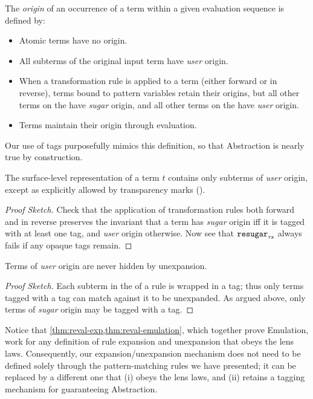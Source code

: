 \begin{definition}
\label{def:reval-origin}
The \emph{origin} of an occurrence of a term within a given evaluation
sequence is defined by:
\begin{itemize}
\item Atomic terms have no origin.
\item All subterms of the original input term have \emph{user} origin.
\item When a transformation rule is applied to a term (either forward or
  in reverse), terms bound to pattern variables retain their origins, but
  all other terms on the  have \emph{sugar} origin, and
  all other terms on the  have \emph{user} origin.
\item Terms maintain their origin through evaluation.
\end{itemize}
\end{definition}

Our use of {\MacBodyf} tags purposefully mimics this definition, so that
Abstraction is nearly true by construction.

\begin{theorem}[Abstraction 1]
\label{thm:reval-abstraction}
The surface-level representation of a term $t$ contains only subterms of
\emph{user} origin, except as explicitly allowed by transparency marks
(\Code{!}).
\end{theorem}
\begin{proof}[Proof Sketch]
Check that the application of transformation rules both forward and in
reverse preserves the invariant that a term has \emph{sugar} origin iff it
is tagged with at least one {\MacBodyf} tag, and \emph{user} origin
otherwise. Now see that $\texttt{resugar}_{\mathit{rs}}$ always fails if any opaque
{\MacBodyf} tags remain.
\end{proof}
\begin{theorem}[Abstraction 2]
Terms of \emph{user} origin are never hidden by unexpansion.
\end{theorem}
\begin{proof}[Proof Sketch]
Each subterm in the  of a rule is wrapped in a {\MacBodyf} tag; thus
only terms tagged with a {\MacBodyf} tag can match against it to be
unexpanded. As argued above, only terms of \emph{sugar} origin may be
tagged with a {\MacBodyf} tag.
\end{proof}

Notice that \cref{thm:reval-exp,thm:reval-emulation}, which together prove
Emulation, work for any definition of rule expansion and unexpansion that
obeys the lens laws. Consequently, our expansion/unexpansion mechanism
does not need to be defined solely through the pattern-matching rules
we have presented; it can be replaced by a different one that
(i) obeys the lens
laws, and (ii) retains a tagging mechanism for guaranteeing Abstraction.


